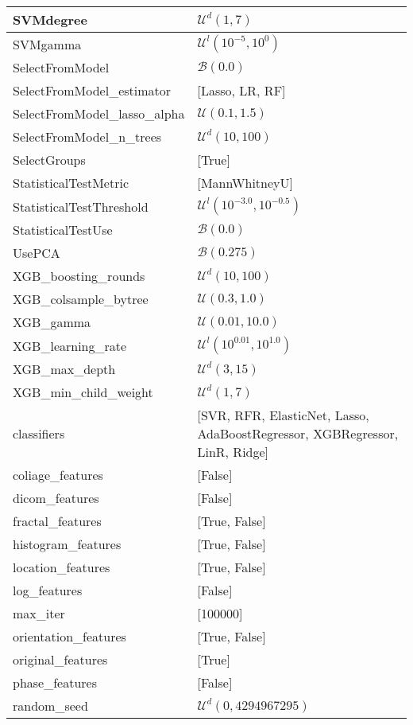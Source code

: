 \begin{table}[]
\begin{tabular}{l|l}
SVMdegree & $\mathcal{U}^d(1, 7)$ \\ \hline
SVMgamma & $\mathcal{U}^l(10^{-5}, 10^{0})$ \\ \hline
SelectFromModel & $\mathcal{B}(0.0)$ \\ \hline
SelectFromModel\_estimator & {[Lasso, LR, RF]} \\ \hline
SelectFromModel\_lasso\_alpha & $\mathcal{U}(0.1, 1.5)$ \\ \hline
SelectFromModel\_n\_trees & $\mathcal{U}^d(10, 100)$ \\ \hline
SelectGroups & {[True]} \\ \hline
StatisticalTestMetric & {[MannWhitneyU]} \\ \hline
StatisticalTestThreshold & $\mathcal{U}^l(10^{-3.0}, 10^{-0.5})$ \\ \hline
StatisticalTestUse & $\mathcal{B}(0.0)$ \\ \hline
UsePCA & $\mathcal{B}(0.275)$ \\ \hline
XGB\_boosting\_rounds & $\mathcal{U}^d(10, 100)$ \\ \hline
XGB\_colsample\_bytree & $\mathcal{U}(0.3, 1.0)$ \\ \hline
XGB\_gamma & $\mathcal{U}(0.01, 10.0)$ \\ \hline
XGB\_learning\_rate & $\mathcal{U}^l(10^{0.01}, 10^{1.0})$ \\ \hline
XGB\_max\_depth & $\mathcal{U}^d(3, 15)$ \\ \hline
XGB\_min\_child\_weight & $\mathcal{U}^d(1, 7)$ \\ \hline
classifiers & {[SVR, RFR, ElasticNet, Lasso, AdaBoostRegressor, XGBRegressor, LinR, Ridge]} \\ \hline
coliage\_features & {[False]} \\ \hline
dicom\_features & {[False]} \\ \hline
fractal\_features & {[True, False]} \\ \hline
histogram\_features & {[True, False]} \\ \hline
location\_features & {[True, False]} \\ \hline
log\_features & {[False]} \\ \hline
max\_iter & {[100000]} \\ \hline
orientation\_features & {[True, False]} \\ \hline
original\_features & {[True]} \\ \hline
phase\_features & {[False]} \\ \hline
random\_seed & $\mathcal{U}^d(0, 4294967295)$ \\ \hline

\end{tabular}
\end{table}

